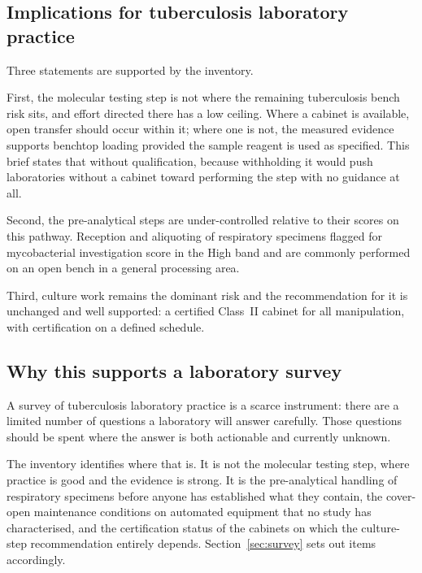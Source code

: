 \subsection{Implications for tuberculosis laboratory practice}

Three statements are supported by the inventory.

First, the molecular testing step is not where the remaining tuberculosis
bench risk sits, and effort directed there has a low ceiling. Where a cabinet
is available, open transfer should occur within it; where one is not, the
measured evidence supports benchtop loading provided the sample reagent is used
as specified. This brief states that without qualification, because withholding
it would push laboratories without a cabinet toward performing the step with no
guidance at all.

Second, the pre-analytical steps are under-controlled relative to their scores
on this pathway. Reception and aliquoting of respiratory specimens flagged for
mycobacterial investigation score in the High band and are commonly performed
on an open bench in a general processing area.

Third, culture work remains the dominant risk and the recommendation for it is
unchanged and well supported: a certified Class~II cabinet for all
manipulation, with certification on a defined schedule.

\subsection{Why this supports a laboratory survey}

A survey of tuberculosis laboratory practice is a scarce instrument: there are
a limited number of questions a laboratory will answer carefully. Those
questions should be spent where the answer is both actionable and currently
unknown.

The inventory identifies where that is. It is not the molecular testing step,
where practice is good and the evidence is strong. It is the pre-analytical
handling of respiratory specimens before anyone has established what they
contain, the cover-open maintenance conditions on automated equipment that no
study has characterised, and the certification status of the cabinets on which
the culture-step recommendation entirely depends.
Section~\ref{sec:survey} sets out items accordingly.
